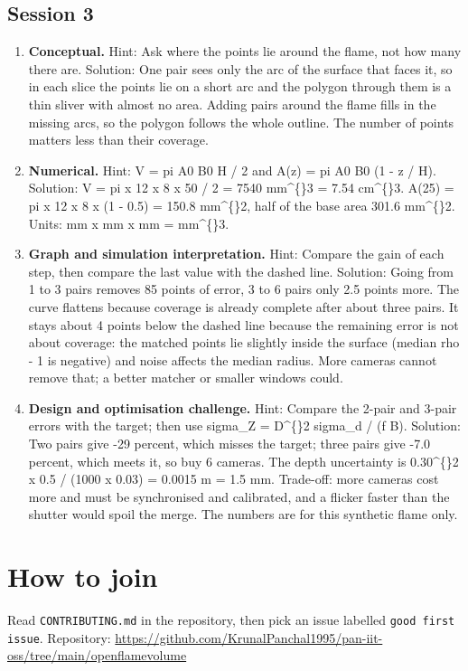 \documentclass[11pt,a4paper]{article}
\begin{document}
\subsection*{Session 3}
\begin{enumerate}[nosep]
\item \textbf{Conceptual.} Hint: Ask where the points lie around the flame, not how many there are. Solution: One pair sees only the arc of the surface that faces it, so in each slice the points lie on a short arc and the polygon through them is a thin sliver with almost no area. Adding pairs around the flame fills in the missing arcs, so the polygon follows the whole outline. The number of points matters less than their coverage.
\item \textbf{Numerical.} Hint: V = pi A0 B0 H / 2 and A(z) = pi A0 B0 (1 - z / H). Solution: V = pi x 12 x 8 x 50 / 2 = 7540 mm\textasciicircum\{\}3 = 7.54 cm\textasciicircum\{\}3. A(25) = pi x 12 x 8 x (1 - 0.5) = 150.8 mm\textasciicircum\{\}2, half of the base area 301.6 mm\textasciicircum\{\}2. Units: mm x mm x mm = mm\textasciicircum\{\}3.
\item \textbf{Graph and simulation interpretation.} Hint: Compare the gain of each step, then compare the last value with the dashed line. Solution: Going from 1 to 3 pairs removes 85 points of error, 3 to 6 pairs only 2.5 points more. The curve flattens because coverage is already complete after about three pairs. It stays about 4 points below the dashed line because the remaining error is not about coverage: the matched points lie slightly inside the surface (median rho - 1 is negative) and noise affects the median radius. More cameras cannot remove that; a better matcher or smaller windows could.
\item \textbf{Design and optimisation challenge.} Hint: Compare the 2-pair and 3-pair errors with the target; then use sigma\_Z = D\textasciicircum\{\}2 sigma\_d / (f B). Solution: Two pairs give -29 percent, which misses the target; three pairs give -7.0 percent, which meets it, so buy 6 cameras. The depth uncertainty is 0.30\textasciicircum\{\}2 x 0.5 / (1000 x 0.03) = 0.0015 m = 1.5 mm. Trade-off: more cameras cost more and must be synchronised and calibrated, and a flicker faster than the shutter would spoil the merge. The numbers are for this synthetic flame only.
\end{enumerate}

\section{How to join}
Read \texttt{CONTRIBUTING.md} in the repository, then pick an issue labelled \texttt{good first issue}. Repository: \url{https://github.com/KrunalPanchal1995/pan-iit-oss/tree/main/openflamevolume}
\end{document}
